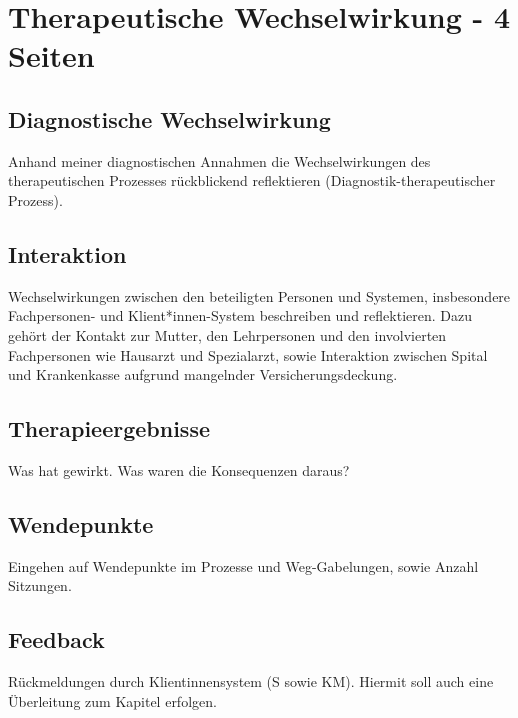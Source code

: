 \section{Therapeutische Wechselwirkung - 4 Seiten} \label{TherapeutischeWechselwirkung}
\subsection{Diagnostische Wechselwirkung} Anhand meiner diagnostischen Annahmen die Wechselwirkungen des therapeutischen Prozesses rückblickend reflektieren (Diagnostik-therapeutischer Prozess). 
\subsection{Interaktion} Wechselwirkungen zwischen den beteiligten Personen und Systemen, insbesondere Fachpersonen- und Klient*innen-System beschreiben und reflektieren. Dazu gehört der Kontakt zur Mutter, den Lehrpersonen und den involvierten Fachpersonen wie Hausarzt und Spezialarzt, sowie Interaktion zwischen Spital und Krankenkasse aufgrund mangelnder Versicherungsdeckung.
\subsection{Therapieergebnisse} Was hat gewirkt. Was waren die Konsequenzen daraus?
\subsection{Wendepunkte} Eingehen auf Wendepunkte im Prozesse und Weg-Gabelungen, sowie Anzahl Sitzungen.
\subsection{Feedback} Rückmeldungen durch Klientinnensystem (S sowie KM). Hiermit soll auch eine Überleitung zum Kapitel  erfolgen.